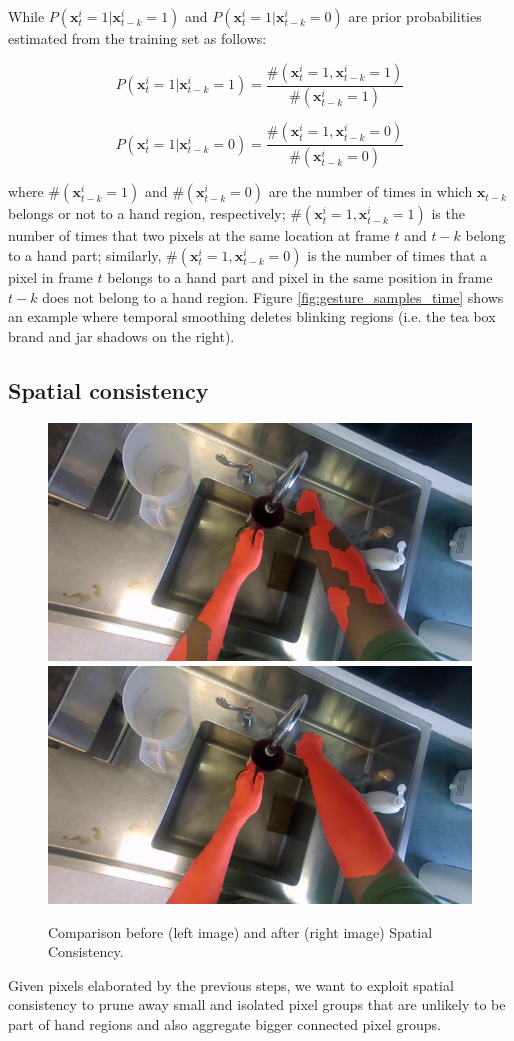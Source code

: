 While $P(\mathbf{x}_{t}^{i}=1|\mathbf{x}_{t-k}^{i}=1)$ and $P(\mathbf{x}_{t}^{i}=1|\mathbf{x}_{t-k}^{i}=0)$ are prior probabilities estimated
from the training set as follows:

\[
P(\mathbf{x}_{t}^{i}=1|\mathbf{x}_{t-k}^{i}=1)=\frac{\#(\mathbf{x}_{t}^{i}=1,\mathbf{x}_{t-k}^{i}=1)}{\#(\mathbf{x}_{t-k}^{i}=1)}
\]


\[
P(\mathbf{x}_{t}^{i}=1|\mathbf{x}_{t-k}^{i}=0)=\frac{\#(\mathbf{x}_{t}^{i}=1,\mathbf{x}_{t-k}^{i}=0)}{\#(\mathbf{x}_{t-k}^{i}=0)}
\]


where $\#(\mathbf{x}_{t-k}^{i}=1)$ and $\#(\mathbf{x}_{t-k}^{i}=0)$ are the number of times in which $\mathbf{x}_{t-k}$ belongs or not to
a hand region, respectively; $\#(\mathbf{x}_{t}^{i}=1,\mathbf{x}_{t-k}^{i}=1)$ is the number
of times that two pixels at the same location at frame $t$ and $t-k$ belong to a hand part; 
similarly, $\#(\mathbf{x}_{t}^{i}=1,\mathbf{x}_{t-k}^{i}=0)$
is the number of times that a pixel in frame $t$ belongs to
a hand part and pixel in the same position in frame $t-k$ does not belong
to a hand region.
Figure \ref{fig:gesture_samples_time} shows an example where temporal smoothing deletes blinking regions (i.e. the tea box brand and jar shadows on the right).


\subsection{Spatial consistency}
\begin{figure}[tb]
\centering
\includegraphics[width=.45\columnwidth]{./Figures/context-free1.jpg}
\includegraphics[width=.45\columnwidth]{./Figures/context-dependent1.jpg}
\caption{Comparison before (left image) and after (right image) Spatial Consistency.}
\label{fig:gesture_samples_space}
\end{figure}
Given pixels elaborated by the previous steps, we want to exploit spatial consistency to prune away small and isolated pixel groups that are unlikely to be part of hand regions and also aggregate bigger connected pixel groups.

